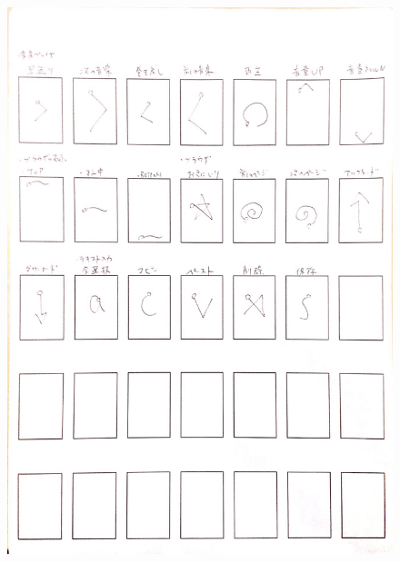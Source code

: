\begin{figure} [p]
 \begin{center}
  \includegraphics [width=1.0\columnwidth]{img/P6.eps}
  \label{fig:elicitation_example}
 \end{center}
\end{figure}